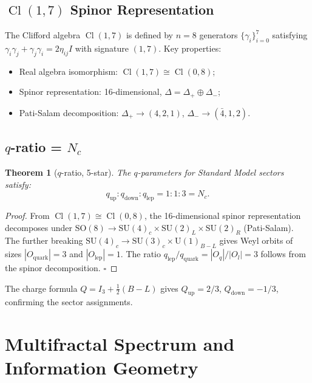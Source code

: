 \documentclass[12pt,a4paper]{article}
\newtheorem{theorem}{Theorem}[section]
\newcommand{\Cl}{\operatorname{Cl}}
\begin{document}
\subsection{$\Cl(1,7)$ Spinor Representation}

The Clifford algebra $\Cl(1,7)$ is defined by $n = 8$ generators 
$\{\gamma_i\}_{i=0}^7$ satisfying $\gamma_i \gamma_j + \gamma_j \gamma_i = 2\eta_{ij}I$ 
with signature $(1,7)$. Key properties:
\begin{itemize}
  \item Real algebra isomorphism: $\Cl(1,7) \cong \Cl(0,8)$;
  \item Spinor representation: 16-dimensional, $\Delta = \Delta_+ \oplus \Delta_-$;
  \item Pati-Salam decomposition: $\Delta_+ \to (4,2,1)$, $\Delta_- \to (\bar{4},1,2)$.
\end{itemize}

\subsection{$q$-ratio = $N_c$}

\begin{theorem}[$q$-ratio, 5-star]
\label{thm:qratio}
The $q$-parameters for Standard Model sectors satisfy:
\begin{equation}
q_{\text{up}} : q_{\text{down}} : q_{\text{lep}} = 1 : 1 : 3 = N_c.
\end{equation}
\end{theorem}

\begin{proof}
From $\Cl(1,7) \cong \Cl(0,8)$, the 16-dimensional spinor representation decomposes 
under $\text{SO}(8) \to \text{SU}(4)_c \times \text{SU}(2)_L \times \text{SU}(2)_R$ 
(Pati-Salam). The further breaking $\text{SU}(4)_c \to \text{SU}(3)_c \times \text{U}(1)_{B-L}$ 
gives Weyl orbits of sizes $|O_{\text{quark}}| = 3$ and $|O_{\text{lep}}| = 1$. 
The ratio $q_{\text{lep}}/q_{\text{quark}} = |O_q|/|O_l| = 3$ follows from the spinor 
decomposition. $\square$
\end{proof}

The charge formula $Q = I_3 + \frac12(B-L)$ gives $Q_{\text{up}} = 2/3$, 
$Q_{\text{down}} = -1/3$, confirming the sector assignments.

\section{Multifractal Spectrum and Information Geometry}
\label{sec:multifractal}
\end{document}
